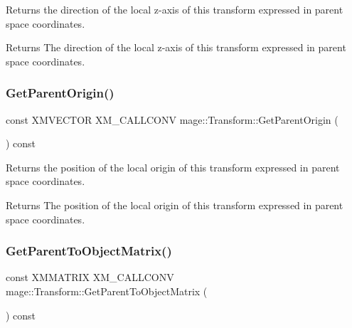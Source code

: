 Returns the direction of the local z-\/axis of this transform expressed in parent space coordinates.

\begin{DoxyReturn}{Returns}
The direction of the local z-\/axis of this transform expressed in parent space coordinates. 
\end{DoxyReturn}
\hypertarget{classmage_1_1_transform_ac781a4843051cdc9b5078dbc641707d1}{}\label{classmage_1_1_transform_ac781a4843051cdc9b5078dbc641707d1} 
\subsubsection{\texorpdfstring{Get\+Parent\+Origin()}{GetParentOrigin()}}
{\footnotesize\ttfamily const X\+M\+V\+E\+C\+T\+OR X\+M\+\_\+\+C\+A\+L\+L\+C\+O\+NV mage\+::\+Transform\+::\+Get\+Parent\+Origin (\begin{DoxyParamCaption}{ }\end{DoxyParamCaption}) const\hspace{0.3cm}{\ttfamily [noexcept]}}

Returns the position of the local origin of this transform expressed in parent space coordinates.

\begin{DoxyReturn}{Returns}
The position of the local origin of this transform expressed in parent space coordinates. 
\end{DoxyReturn}
\hypertarget{classmage_1_1_transform_a89ea42ba5daef39d8683bb69847d275e}{}\label{classmage_1_1_transform_a89ea42ba5daef39d8683bb69847d275e} 
\subsubsection{\texorpdfstring{Get\+Parent\+To\+Object\+Matrix()}{GetParentToObjectMatrix()}}
{\footnotesize\ttfamily const X\+M\+M\+A\+T\+R\+IX X\+M\+\_\+\+C\+A\+L\+L\+C\+O\+NV mage\+::\+Transform\+::\+Get\+Parent\+To\+Object\+Matrix (\begin{DoxyParamCaption}{ }\end{DoxyParamCaption}) const\hspace{0.3cm}{\ttfamily [noexcept]}}

